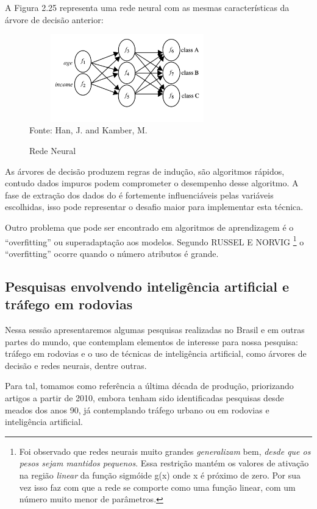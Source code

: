 A Figura 2.25 representa uma rede neural com as mesmas características da árvore de decisão anterior:
\begin{figure}[!ht]
	\centering
	\caption{Rede Neural}
	\includegraphics[width=85mm, height=38mm]{Figuras/BigData/redeneural.png}\\
	\tiny Fonte: Han, J. and Kamber, M. 
\end{figure}  

As árvores de decisão produzem regras de indução, são algoritmos rápidos, contudo dados impuros podem comprometer o desempenho desse algoritmo. 
A fase de extração dos dados do é fortemente influenciáveis pelas variáveis escolhidas, \cite{DecisionTree} 
isso pode representar o desafio maior para implementar esta técnica. 

Outro problema que pode ser encontrado em algoritmos de aprendizagem é o ``overfitting'' ou superadaptação aos modelos.
Segundo RUSSEL E NORVIG \cite{NorvigRussel2004}  \footnote{Foi observado que redes neurais muito grandes \textit{generalizam} bem, 
\textit{desde que os pesos sejam mantidos pequenos}. Essa restrição mantém os valores de ativação na região 
\textit{linear} da função sigmóide g(x) onde x é próximo de zero. Por sua vez isso faz com que a rede se comporte 
como uma função linear, com um número muito menor de parâmetros.} o ``overfitting'' ocorre quando o número atributos é grande.


\subsection{Pesquisas envolvendo inteligência artificial e tráfego em rodovias}

Nessa sessão apresentaremos algumas pesquisas realizadas no Brasil e em outras partes do mundo, que contemplam elementos de interesse para nossa pesquisa: tráfego em rodovias e o uso de técnicas de inteligência artificial, como árvores de decisão e redes neurais, dentre outras.

Para tal, tomamos como referência a última década de produção, priorizando artigos a partir de 2010, embora tenham sido identificadas pesquisas desde meados dos anos 90, já contemplando tráfego urbano ou em rodovias e inteligência artificial.

